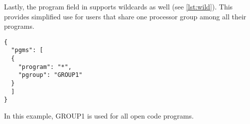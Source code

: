 Lastly, the program field in  supports wildcards as well (see \cref{lst:wild}). This provides simplified use for users that share one processor group among all their programs.

\begin{listing}
	\begin{verbatim}
{
  "pgms": [
  {
    "program": "*",
    "pgroup": "GROUP1"  
  }
  ]
}
	\end{verbatim}
	\caption{In this example, GROUP1 is used for all open code programs.}
	\label{lst:wild}
\end{listing}
